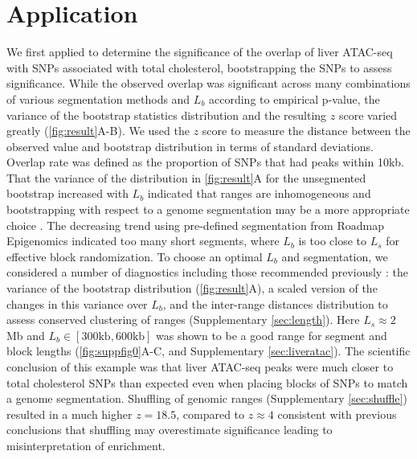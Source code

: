 \section{Application}

We first applied \bootranges to determine the significance of the
overlap of liver ATAC-seq
\citep{CURRIN20211169} with SNPs associated with total cholesterol,
bootstrapping the SNPs to assess significance.
While the observed overlap was significant across many combinations of
various segmentation methods and $L_b$ according to empirical p-value, 
the variance of the
bootstrap statistics distribution and the resulting $z$ score varied greatly
(\cref{fig:result}A-B).
We used the $z$ score to measure the distance between the observed
value and bootstrap distribution in terms of standard deviations.
Overlap rate was defined as the proportion of
SNPs that had peaks within 10kb.
That the variance of the distribution in \cref{fig:result}A for the
unsegmented bootstrap increased with $L_b$ indicated that
ranges are inhomogeneous and
bootstrapping with respect to a genome
segmentation may be a more appropriate choice
\citep{bickel2010subsampling}. 
The decreasing trend using pre-defined segmentation from
Roadmap Epigenomics indicated too many short segments,
where $L_b$ is too close to $L_s$ for effective block randomization.
To choose an optimal $L_b$ and segmentation, 
we considered a number of diagnostics including
those recommended previously \citep{bickel2010subsampling}:
the variance of the bootstrap distribution (\cref{fig:result}A),
a scaled version of the changes in this variance over $L_b$,
and the inter-range distances distribution to assess conserved
clustering of ranges (Supplementary \cref{sec:length}).
Here $L_s \approx 2$ Mb and $L_b \in [300\textrm{kb},600\textrm{kb}]$ was 
shown to be a good range for segment and block
lengths (\cref{fig:suppfig0}A-C, and Supplementary \cref{sec:liveratac}).
The scientific conclusion of this example was that liver ATAC-seq
peaks were
much closer to total cholesterol SNPs than expected even when placing
blocks of SNPs to match a genome segmentation.
Shuffling of genomic ranges (Supplementary \cref{sec:shuffle})
resulted in a much higher $z = 18.5$, compared to $z \approx 4$ 
consistent with previous conclusions that shuffling may 
overestimate significance leading to misinterpretation of enrichment.


